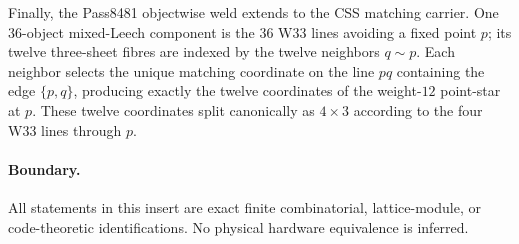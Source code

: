Finally, the Pass8481 objectwise weld extends to the CSS matching carrier.  One $36$-object mixed-Leech component is the $36$ W33 lines avoiding a fixed point $p$; its twelve three-sheet fibres are indexed by the twelve neighbors $q\sim p$.  Each neighbor selects the unique matching coordinate on the line $pq$ containing the edge $\{p,q\}$, producing exactly the twelve coordinates of the weight-$12$ point-star at $p$.  These twelve coordinates split canonically as $4\times3$ according to the four W33 lines through $p$.

\paragraph{Boundary.} All statements in this insert are exact finite combinatorial, lattice-module, or code-theoretic identifications.  No physical hardware equivalence is inferred.
